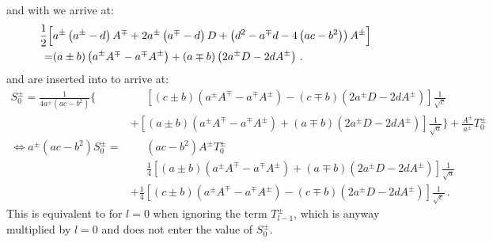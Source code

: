 and with  we arrive at:
\begin{align}
 \frac{1}{2} \Bigl[ &
          a^{\pm} \left( a^{\pm} - d               \right) A^{\mp}
      + 2 a^{\pm} \left( a^{\mp} - d               \right) D
      +           \left( d^2 - a^{\mp}d -4\left(ac-b^2\right) \right) A^{\pm} \Bigr] \nonumber \\
 =&   (a\pm b) \left( a^{\pm} A^{\mp} - a^{\mp} A^{\pm} \right)
    + (a\mp b) \left( 2 a^{\pm} D - 2 d A^{\pm} \right) \, . \label{eqn:factor_S0_sqrt_a}
\end{align}
 and  are inserted into  to arrive at:
\begin{align}
  S^{\pm}_0
  = \frac{1}{4 a^{\pm}\left(ac-b^2\right)} \Biggl\{
       & \phantom{+}\,
       \left[
           (c \pm b) \left(   a^{\pm} A^{\mp} -   a^{\mp} A^{\pm} \right)
         - (c \mp b) \left( 2 a^{\pm} D       - 2 d       A^{\pm} \right)
       \right] \frac{1}{\sqrt{c}} \nonumber \\
  ~&   +
       \left[
           (a\pm b) \left( a^{\pm} A^{\mp} - a^{\mp} A^{\pm} \right)
         + (a\mp b) \left( 2 a^{\pm} D - 2 d A^{\pm} \right)
       \right] \frac{1}{\sqrt{a}}
     \Biggr\}
     + \frac{A^{\pm}}{a^{\pm}} T^{\pm}_0 \nonumber \\
\Leftrightarrow
  a^{\pm} \left(ac-b^2\right) S^{\pm}_0
  =& \phantom{+}\,
       \left(ac-b^2\right) A^{\pm} T^{\pm}_0 \nonumber \\
  ~& \phantom{+}~
       \frac{1}{4}
       \left[
           (a\pm b) \left( a^{\pm} A^{\mp} - a^{\mp} A^{\pm} \right)
         + (a\mp b) \left( 2 a^{\pm} D - 2 d A^{\pm} \right)
       \right] \frac{1}{\sqrt{a}} \nonumber \\
  ~& + \frac{1}{4}
       \left[
           (c \pm b) \left(   a^{\pm} A^{\mp} -   a^{\mp} A^{\pm} \right)
         - (c \mp b) \left( 2 a^{\pm} D       - 2 d       A^{\pm} \right)
       \right] \frac{1}{\sqrt{c}} \, .
\end{align}
This is equivalent to  for $l=0$ when ignoring the term $T^{\pm}_{l-1}$,
which is anyway multiplied by $l=0$ and does not enter the value of $S^{\pm}_0$.


